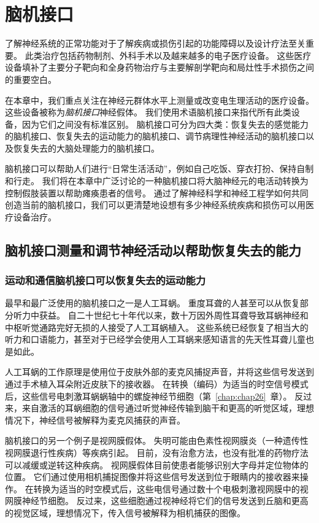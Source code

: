 \chapter{脑机接口} \label{chap:chap39}

了解神经系统的正常功能对于了解疾病或损伤引起的功能障碍以及设计疗法至关重要。
此类治疗包括药物制剂、外科手术以及越来越多的电子医疗设备。
这些医疗设备填补了主要分子靶向和全身药物治疗与主要解剖学靶向和局灶性手术损伤之间的重要空白。


在本章中，我们重点关注在神经元群体水平上测量或改变电生理活动的医疗设备。
这些设备被称为\textit{脑机接口}神经假体。
我们使用术语脑机接口来指代所有此类设备，因为它们之间没有标准区别。
脑机接口可分为四大类：恢复失去的感觉能力的脑机接口、恢复失去的运动能力的脑机接口、调节病理性神经活动的脑机接口以及恢复失去的大脑处理能力的脑机接口。


脑机接口可以帮助人们进行“日常生活活动”，例如自己吃饭、穿衣打扮、保持自制和行走。
我们将在本章中广泛讨论的一种脑机接口将大脑神经元的电活动转换为控制假肢装置以帮助瘫痪患者的信号。
通过了解神经科学和神经工程学如何共同创造当前的脑机接口，我们可以更清楚地设想有多少神经系统疾病和损伤可以用医疗设备治疗。



\section{脑机接口测量和调节神经活动以帮助恢复失去的能力}

\subsection{运动和通信脑机接口可以恢复失去的运动能力}

最早和最广泛使用的脑机接口之一是人工耳蜗。
重度耳聋的人甚至可以从恢复部分听力中获益。
自二十世纪七十年代以来，数十万因外周性耳聋导致耳蜗神经和中枢听觉通路完好无损的人接受了人工耳蜗植入。 
这些系统已经恢复了相当大的听力和口语能力，甚至对于已经学会使用人工耳蜗来感知语言的先天性耳聋儿童也是如此。


人工耳蜗的工作原理是使用位于皮肤外部的麦克风捕捉声音，并将这些信号发送到通过手术植入耳朵附近皮肤下的接收器。
在转换（编码）为适当的时空信号模式后，这些信号电刺激耳蜗蜗轴中的螺旋神经节细胞（第~\ref{chap:chap26}~章）。
反过来，来自激活的耳蜗细胞的信号通过听觉神经传输到脑干和更高的听觉区域，理想情况下，神经信号被解释为麦克风捕获的声音。


脑机接口的另一个例子是视网膜假体。
失明可能由色素性视网膜炎（一种遗传性视网膜退行性疾病）等疾病引起。
目前，没有治愈方法，也没有批准的药物疗法可以减缓或逆转这种疾病。
视网膜假体目前使患者能够识别大字母并定位物体的位置。
它们通过使用相机捕捉图像并将这些信号发送到位于眼睛内的接收器来操作。
在转换为适当的时空模式后，这些电信号通过数十个电极刺激视网膜中的视网膜神经节细胞。
反过来，这些细胞通过视神经将它们的信号发送到丘脑和更高的视觉区域，理想情况下，传入信号被解释为相机捕获的图像。



